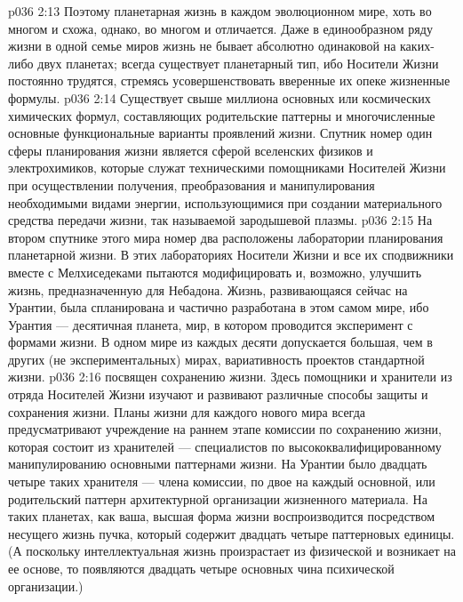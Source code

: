 \vs p036 2:13 Поэтому планетарная жизнь в каждом эволюционном мире, хоть во многом и схожа, однако, во многом и отличается. Даже в единообразном ряду жизни в одной семье миров жизнь не бывает абсолютно одинаковой на каких\hyp{}либо двух планетах; всегда существует планетарный тип, ибо Носители Жизни постоянно трудятся, стремясь усовершенствовать вверенные их опеке жизненные формулы.
\vs p036 2:14 Существует свыше миллиона основных или космических химических формул, составляющих родительские паттерны и многочисленные основные функциональные варианты проявлений жизни. Спутник номер один сферы планирования жизни является сферой вселенских физиков и электрохимиков, которые служат техническими помощниками Носителей Жизни при осуществлении получения, преобразования и манипулирования необходимыми видами энергии, использующимися при создании материального средства передачи жизни, так называемой зародышевой плазмы.
\vs p036 2:15 На втором спутнике этого мира номер два расположены лаборатории планирования планетарной жизни. В этих лабораториях Носители Жизни и все их сподвижники вместе с Мелхиседеками пытаются модифицировать и, возможно, улучшить жизнь, предназначенную для  Небадона. Жизнь, развивающаяся сейчас на Урантии, была спланирована и частично разработана в этом самом мире, ибо Урантия --- десятичная планета, мир, в котором проводится эксперимент с формами жизни. В одном мире из каждых десяти допускается большая, чем в других (не экспериментальных) мирах, вариативность проектов стандартной жизни.
\vs p036 2:16 \pc {} посвящен сохранению жизни. Здесь помощники и хранители из отряда Носителей Жизни изучают и развивают различные способы защиты и сохранения жизни. Планы жизни для каждого нового мира всегда предусматривают учреждение на раннем этапе комиссии по сохранению жизни, которая состоит из хранителей --- специалистов по высококвалифицированному манипулированию основными паттернами жизни. На Урантии было двадцать четыре таких хранителя --- члена комиссии, по двое на каждый основной, или родительский паттерн архитектурной организации жизненного материала. На таких планетах, как ваша, высшая форма жизни воспроизводится посредством несущего жизнь пучка, который содержит двадцать четыре паттерновых единицы. (А поскольку интеллектуальная жизнь произрастает из физической и возникает на ее основе, то появляются двадцать четыре основных чина психической организации.)
